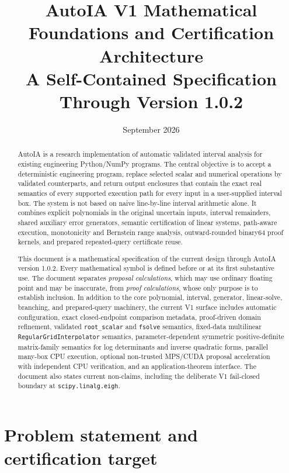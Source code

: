 \documentclass[11pt]{article}
\title{\textbf{AutoIA V1 Mathematical Foundations and Certification Architecture}\\
A Self-Contained Specification Through Version 1.0.2}
\author{}
\date{September 2026}
\begin{document}
\maketitle

\begin{abstract}
AutoIA is a research implementation of automatic validated interval analysis for
existing engineering Python/NumPy programs.  The central objective is to accept a
deterministic engineering program, replace selected scalar and numerical operations
by validated counterparts, and return output enclosures that contain the exact real
semantics of every supported execution path for every input in a user-supplied
interval box.  The system is not based on naive line-by-line interval arithmetic
alone.  It combines explicit polynomials in the original uncertain inputs,
interval remainders, shared auxiliary error generators, semantic certification of
linear systems, path-aware execution, monotonicity and Bernstein range analysis,
outward-rounded binary64 proof kernels, and prepared repeated-query certificate
reuse.

This document is a mathematical specification of the current design through
AutoIA version 1.0.2.  Every mathematical symbol is defined before or at
its first substantive use.  The document separates \emph{proposal calculations},
which may use ordinary floating point and may be inaccurate, from \emph{proof
calculations}, whose only purpose is to establish inclusion.  In addition to the
core polynomial, interval, generator, linear-solve, branching, and prepared-query
machinery, the current V1 surface includes automatic configuration, exact
closed-endpoint comparison metadata, proof-driven domain refinement, validated
\texttt{root\_scalar} and \texttt{fsolve} semantics, fixed-data multilinear
\texttt{RegularGridInterpolator} semantics, parameter-dependent symmetric
positive-definite matrix-family semantics for log determinants and inverse
quadratic forms, parallel many-box CPU execution, optional non-trusted MPS/CUDA
proposal acceleration with independent CPU verification, and an
application-theorem interface.  The document also states current non-claims,
including the deliberate V1 fail-closed boundary at \texttt{scipy.linalg.eigh}.
\end{abstract}

\tableofcontents
\newpage

\section{Problem statement and certification target}
\end{document}
